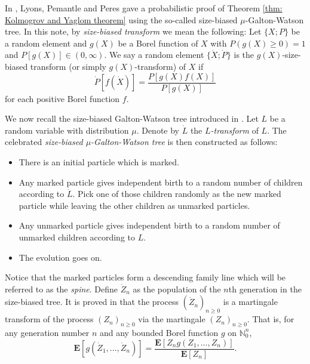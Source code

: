 \documentclass[12pt,a4paper]{amsart}
\numberwithin{equation}{section}
\begin{document}
	In \cite{lyons1995conceptual}, Lyons, Pemantle and Peres gave a probabilistic proof of Theorem \ref{thm: Kolmogrov and Yaglom theorem} using the so-called size-biased $\mu$-Galton-Watson tree.
	In this note, by \emph{size-biased transform} we mean the following: 
	Let $\{X;P\}$ be a random element and $g(X)$ be a Borel function of $X$ with $P(g(X) \geq 0) = 1$ and $P[g(X)]\in (0,\infty)$. 
	We say a random element $\{\dot X;\dot P\}$ is the $g(X)$-size-biased transform (or simply $g(X)$-transform) of $X$ if 
	\[
		\dot P[f(\dot X)] = \frac{ P[g(X)f(X)]}{P[g(X)]} 
	\]
	for each positive Borel function $f$.

	We now recall the size-biased Galton-Watson tree introduced in \cite{lyons1995conceptual}.
	Let $L$ be a random variable with distribution $\mu$.
	Denote by $\dot L$ the \emph{$L$-transform} of $L$.
	The celebrated \emph{size-biased $\mu$-Galton-Watson tree} is then constructed as follows:
\begin{itemize}
\item
	There is an initial particle which is marked.
\item
	Any marked particle gives independent birth to a random number of children according to $\dot L$. Pick one of those children randomly as the new marked particle while leaving the other children as unmarked particles.
\item
	Any unmarked particle gives independent birth to a random number of unmarked children according to $L$.
\item
	The evolution goes on.
\end{itemize}

	Notice that the marked particles form a descending family line which will be referred to as the \emph{spine}.
	Define $\dot Z_n$ as the population of the $n$th generation in the size-biased tree.
	It is proved in \cite{lyons1995conceptual} that the process $(\dot Z_n)_{n\ge 0}$ is a martingale transform of the process $(Z_n)_{n\ge 0}$ 
	via the martingale $(Z_n)_{n\ge 0}.$
	That is, for any generation number $n$ and any bounded Borel function $g$ on $\mathbb N_0^{n}$,
\begin{equation}
\label{eq:htransformation}
	\mathbf E [ g ( \dot Z_1, \dots, \dot Z_n) ]
	= \frac { \mathbf E[ Z_n g( Z_1, \dots, Z_n)]} {\mathbf E [ Z_n]}.
\end{equation}
\end{document}
